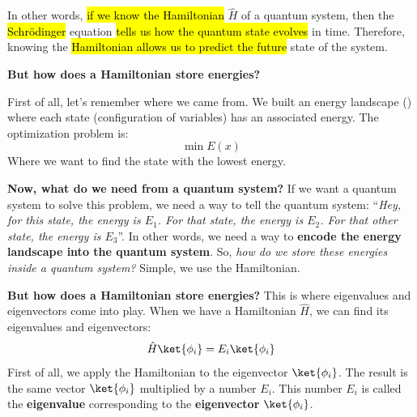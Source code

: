 \highspace
In other words, \hl{if we know the Hamiltonian} $\hat{H}$ of a quantum system, then the \hl{Schrödinger} equation \hl{tells us how the quantum state evolves} in time. Therefore, knowing the \hl{Hamiltonian allows us to predict the future} state of the system.

\highspace
\begin{flushleft}
    \textcolor{Green3}{ \textbf{But how does a Hamiltonian store energies?}}
\end{flushleft}
First of all, let's remember where we came from. We built an energy landscape () where each state (configuration of variables) has an associated energy. The optimization problem is:
\begin{equation*}
    \min E(x)
\end{equation*}
Where we want to find the state with the lowest energy.

\highspace
\textcolor{Green3}{ \textbf{Now, what do we need from a quantum system?}} If we want a quantum system to solve this problem, we need a way to tell the quantum system: ``\emph{Hey, for this state, the energy is $E_1$. For that state, the energy is $E_2$. For that other state, the energy is $E_3$}''. In other words, we need a way to \textbf{encode the energy landscape into the quantum system}. So, \emph{how do we store these energies inside a quantum system?} Simple, we use the Hamiltonian.

\highspace
\textcolor{Green3}{ \textbf{But how does a Hamiltonian store energies?}} This is where eigenvalues and eigenvectors come into play. When we have a Hamiltonian $\hat{H}$, we can find its eigenvalues and eigenvectors:
\begin{equation}\label{eq:hamiltonian-eigenvalues-eigenvectors}
    \hat{H} \ket{\phi_i} = E_i \ket{\phi_i}
\end{equation}
First of all, we apply the Hamiltonian to the eigenvector $\ket{\phi_i}$. The result is the same vector $\ket{\phi_i}$ multiplied by a number $E_i$. This number $E_i$ is called the \textbf{eigenvalue} corresponding to the \textbf{eigenvector} $\ket{\phi_i}$.

